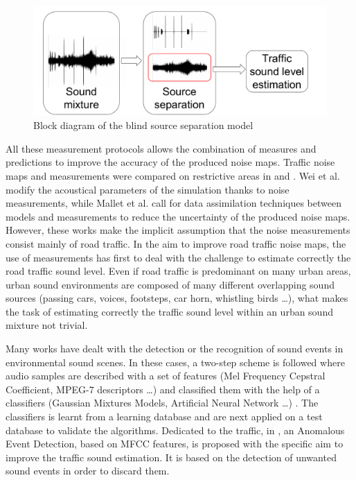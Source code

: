 \documentclass[review,5p,twocolumn,sort&compress,times]{elsarticle}
\begin{document}
\begin{figure}[t]
\centering
\includegraphics[width=.9\linewidth]{figures/bloc_diagram_source_separation.pdf}
\caption{Block diagram of the blind source separation model}
\label{fig:source_separation}
\end{figure}

All these measurement protocols allows the combination of measures and predictions to improve the accuracy of the produced noise maps. Traffic noise maps and measurements were compared on restrictive areas in \cite{lefebvre2017traffic} and \cite{mioduszewski2011noise}. Wei et al. \cite{wei_dynamic_2016} modify the acoustical parameters of the simulation thanks to noise measurements, while  Mallet et al. \cite{ventura2017estimation} call for data assimilation techniques between models and measurements to reduce the uncertainty of the produced noise maps. However, these works make the implicit assumption that the noise measurements consist mainly of road traffic. In the aim to improve road traffic noise maps, the use of measurements has first to deal with the challenge to estimate correctly the road traffic sound level.
Even if road traffic is predominant on many urban areas, urban sound environments are composed of many different overlapping sound sources (passing cars, voices, footsteps, car horn, whistling birds \dots), what makes the task of estimating correctly the traffic sound level within an urban sound mixture not trivial.

Many works have dealt with the detection \cite{luitel2016sound} or the recognition \cite{defreville_automatic_2006} of sound events in environmental sound scenes. In these cases, a two-step scheme is followed where audio samples are described with a set of features (Mel Frequency Cepstral Coefficient, MPEG-7 descriptors \dots) and classified them with the help of a classifiers (Gaussian Mixtures Models, Artificial Neural Network \dots) \cite{chu2008environmental, cowling_comparison_2003}. The classifiers is learnt from a learning database and are next applied on a test database to validate the algorithms.
Dedicated to the traffic, in \cite{socoro_anomalous_2017}, an Anomalous Event Detection, based on MFCC features, is proposed with the specific aim to improve the traffic sound estimation. It is based on the detection of unwanted sound events in order to discard them.
\end{document}

